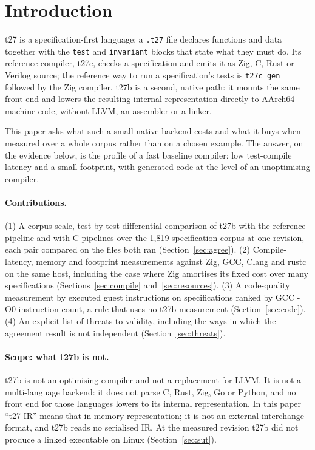\documentclass[11pt,a4paper]{article}
\begin{document}
\section{Introduction}

t27 is a specification-first language: a \texttt{.t27} file declares
functions and data together with the \texttt{test} and \texttt{invariant}
blocks that state what they must do. Its reference compiler, t27c, checks
a specification and emits it as Zig, C, Rust or Verilog source; the
reference way to run a specification's tests is \texttt{t27c gen} followed
by the Zig compiler. t27b is a second, native path: it mounts the same
front end and lowers the resulting internal representation directly to
AArch64 machine code, without LLVM, an assembler or a linker.

This paper asks what such a small native backend costs and what it buys
when measured over a whole corpus rather than on a chosen example. The
answer, on the evidence below, is the profile of a fast baseline compiler:
low test-compile latency and a small footprint, with generated code at the
level of an unoptimising compiler.

\paragraph{Contributions.}
(1) A corpus-scale, test-by-test differential comparison of t27b with the
reference pipeline and with C pipelines over the 1,819-specification
corpus at one revision, each pair compared on the files both ran
(Section~\ref{sec:agree}).
(2) Compile-latency, memory and footprint measurements against Zig, GCC,
Clang and rustc on the same host, including the case where Zig amortises
its fixed cost over many specifications (Sections~\ref{sec:compile}
and~\ref{sec:resources}).
(3) A code-quality measurement by executed guest instructions on
specifications ranked by GCC -O0 instruction count, a rule that uses no
t27b measurement (Section~\ref{sec:code}).
(4) An explicit list of threats to validity, including the ways in which
the agreement result is not independent (Section~\ref{sec:threats}).

\paragraph{Scope: what t27b is not.}
t27b is not an optimising compiler and not a replacement for LLVM. It is
not a multi-language backend: it does not parse C, Rust, Zig, Go or
Python, and no front end for those languages lowers to its internal
representation. In this paper ``t27 IR'' means that in-memory
representation; it is not an external interchange format, and t27b reads
no serialised IR. At the measured revision t27b did not produce a linked
executable on Linux (Section~\ref{sec:sut}).
\end{document}
